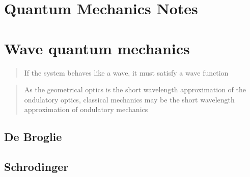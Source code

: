 \documentclass[letterpaper,10pt,english]{jupyterBook}
\begin{document}
\sphinxstepscope


\chapter{Quantum Mechanics \sphinxhyphen{} Notes}
\label{\detokenize{ch/quantum-mechanics/notes:quantum-mechanics-notes}}\label{\detokenize{ch/quantum-mechanics/notes:id1}}\label{\detokenize{ch/quantum-mechanics/notes::doc}}
\sphinxstepscope


\chapter{Wave quantum mechanics}
\label{\detokenize{ch/quantum-mechanics/wave-mechanics:wave-quantum-mechanics}}\label{\detokenize{ch/quantum-mechanics/wave-mechanics:quantum-mechanics-wave-mechanics}}\label{\detokenize{ch/quantum-mechanics/wave-mechanics::doc}}\begin{quote}

\sphinxAtStartPar
If the system behaves like a wave, it must satisfy a wave function
\end{quote}
\begin{quote}

\sphinxAtStartPar
As the geometrical optics is the short wave\sphinxhyphen{}length approximation of the ondulatory optics, classical mechanics may be the short wave\sphinxhyphen{}length approximation of ondulatory mechanics
\end{quote}


\section{De Broglie}
\label{\detokenize{ch/quantum-mechanics/wave-mechanics:de-broglie}}

\section{Schrodinger}
\label{\detokenize{ch/quantum-mechanics/wave-mechanics:schrodinger}}
\end{document}
